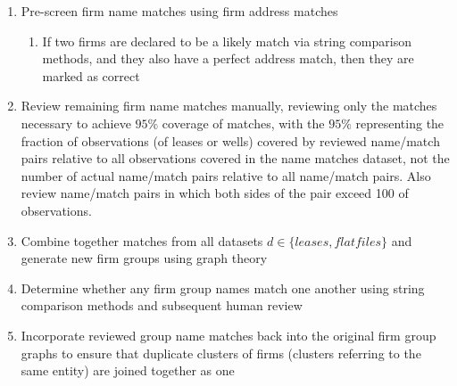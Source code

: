 \documentclass{article}
\begin{document}
\begin{enumerate}
    \item Pre-screen firm name matches using firm address matches
    \begin{enumerate}
    \item If two firms are declared to be a likely match via string comparison methods, and they also have a perfect address match, then they are marked as correct
    \end{enumerate}
    
    \item Review remaining firm name matches manually, reviewing only the matches necessary to achieve $95\%$ coverage of matches, with the $95\%$ representing the fraction of observations (of leases or wells) covered by reviewed name/match pairs relative to all observations covered in the name matches dataset, not the number of actual name/match pairs relative to all name/match pairs. Also review name/match pairs in which both sides of the pair exceed 100 of observations. 
    
    \item Combine together matches from all datasets $d \in \{leases, flatfiles\}$ and generate new firm groups using graph theory
    
    \item Determine whether any firm group names match one another using string comparison methods and subsequent human review
    
    \item Incorporate reviewed group name matches back into the original firm group graphs to ensure that duplicate clusters of firms (clusters referring to the same entity) are joined together as one 
\end{enumerate}
\end{document}
